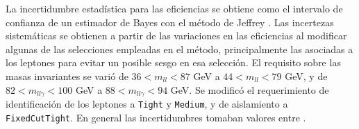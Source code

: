 La incertidumbre estadística para las eficiencias se obtiene como el intervalo de confianza de un estimador de Bayes con el método de Jeffrey \cite{jeffrey} . Las incertezas sistemáticas se obtienen a partir de las variaciones en las eficiencias al modificar algunas de las selecciones empleadas en el método, principalmente las asociadas a los leptones para evitar un posible sesgo en esa selección. El requisito sobre las masas invariantes se varió de $36<m_{ll}<87$ GeV a $44<m_{ll}<79$ GeV, y de 
$82<m_{ll\gamma}<100$ GeV a $88<m_{ll\gamma}<94$ GeV. Se modificó el requerimiento de identificación de los leptones a \texttt{Tight} y \texttt{Medium}, y de aislamiento a \texttt{FixedCutTight}. En general las incertidumbres tomaban valores entre .





